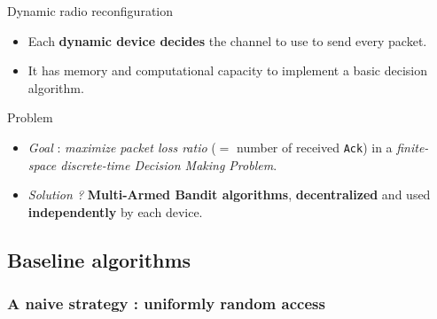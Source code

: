 \begin{frameO}[Hypotheses ($2/2$)]

    \begin{colorblock}{Dynamic radio reconfiguration}

        \begin{itemize}
            \item
                Each \textbf{dynamic device decides} the channel to use to send every packet.
            \item
                It has memory and computational capacity to implement a basic decision algorithm.
        \end{itemize}

    \end{colorblock}

    \vspace*{20pt}

    \begin{lightblock}{Problem}

        \begin{itemize}
            \item
                  \emph{Goal} : \emph{maximize packet loss ratio} (\(=\) number of
                  received \texttt{Ack}) in a \emph{finite-space discrete-time Decision
                      Making Problem}.
            \item
                  \emph{Solution ?} \textbf{Multi-Armed Bandit algorithms},
                  \textbf{decentralized} and used \textbf{independently} by each device.
        \end{itemize}

    \end{lightblock}

\end{frameO}



\subsection{Baseline algorithms}

\subsubsection{A naive strategy : uniformly random access}

